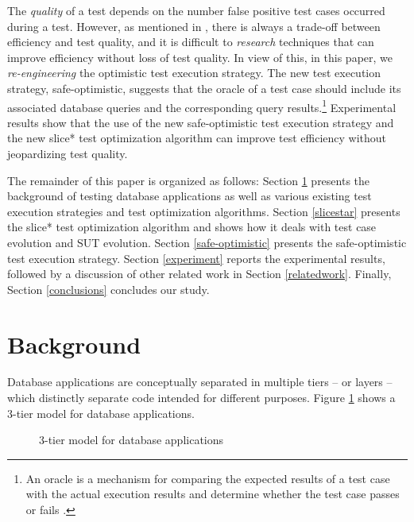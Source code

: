 \documentclass[authoryear,preprint,12pt]{elsarticle}
\begin{document}
The \emph{quality} of a test depends on the number false positive test cases occurred during a test.
However, as mentioned in \cite{cidr05}, there is always a trade-off between efficiency and test quality, 
and it is difficult to \emph{research} techniques that can improve efficiency without loss of test quality.
In view of this, in this paper, we \emph{re-engineering} 
the {\sc optimistic} test execution strategy.
The new test execution strategy, {\sc safe-optimistic}, suggests 
that the oracle of a test case should include its associated database queries and the corresponding query results.\footnote{An oracle is a mechanism for
comparing the expected results of a test case with the actual execution results
and determine whether the test case passes or fails \cite{BinderTestingOOSystems}.}
Experimental results show that 
the use of the new {\sc safe-optimistic} test execution strategy and the new {\sc slice*} test optimization algorithm
can improve test efficiency without jeopardizing test quality.

The remainder of this paper is organized as follows: 
Section \ref{background} presents the background of testing database applications as well as 
various existing test execution strategies and test optimization algorithms.
Section \ref{slicestar} presents the {\sc slice*} test optimization algorithm and shows
how it deals with test case evolution and SUT evolution.
Section \ref{safe-optimistic} presents the {\sc safe-optimistic} test execution strategy.
Section \ref{experiment} reports the experimental results,
followed by a discussion of other related work in Section \ref{relatedwork}.
Finally, Section \ref{conclusions} concludes our study.


\section{Background}
\label{background}
  
  
Database applications are conceptually separated in multiple tiers -- or layers -- which distinctly separate code intended for different purposes.  Figure \ref{dba} shows a 3-tier model for database applications.

\begin{figure}
\centering
{}
\caption{3-tier model for database applications}
\label{dba}
\end{figure}
\end{document}
